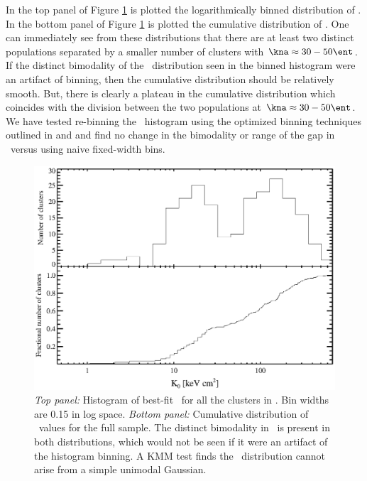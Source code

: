 In the top panel of Figure \ref{fig:k0hist} is plotted the
logarithmically binned distribution of \kna. In the bottom panel of
Figure \ref{fig:k0hist} is plotted the cumulative distribution of
\kna. One can immediately see from these distributions that there are
at least two distinct populations separated by a smaller number of
clusters with $\kna \approx 30-50 \ent$. If the distinct bimodality of
the \kna\ distribution seen in the binned histogram were an artifact
of binning, then the cumulative distribution should be relatively
smooth. But, there is clearly a plateau in the cumulative distribution
which coincides with the division between the two populations at $\kna
\approx 30-50 \ent$. We have tested re-binning the \kna\ histogram
using the optimized binning techniques outlined in \citet{knuthbin}
and \citet{2008arXiv0807.4820H} and find no change in the bimodality
or range of the gap in \kna\ versus using naive fixed-width bins.

\begin{figure}[htp]
  \begin{center}
    \begin{minipage}[htp]{0.9\linewidth}
      \includegraphics*[width=\textwidth, trim=20mm 10mm 10mm 10mm, clip]{k0hist.eps}
      \caption[Histogram of best-fit \kna\ for all
        the clusters in \accept.]{{\it{Top panel:}} Histogram of best-fit \kna\ for all
        the clusters in \accept. Bin widths are 0.15 in log space.
        {\it{Bottom panel:}} Cumulative distribution of \kna\ values
        for the full sample. The distinct bimodality in \kna\ is
        present in both distributions, which would not be seen if it
        were an artifact of the histogram binning. A KMM test finds
        the \kna\ distribution cannot arise from a simple unimodal
        Gaussian.}
      \label{fig:k0hist}
    \end{minipage}
  \end{center}
\end{figure}

